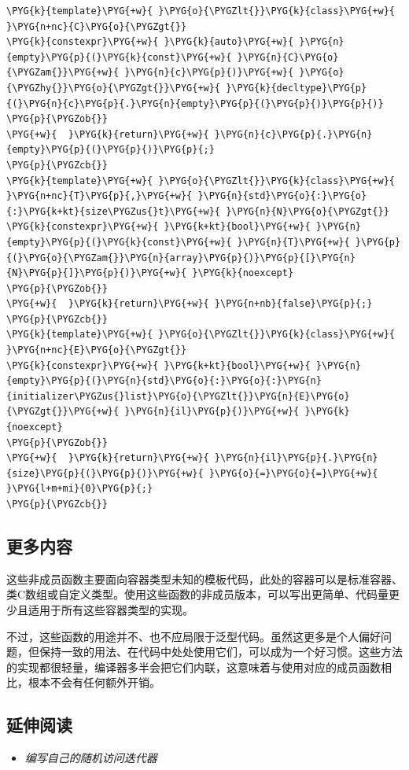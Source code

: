 \begin{itemize}
\begin{codeblockbg}
\begin{Verbatim}[commandchars=\\\{\},breaklines=true,breakanywhere=true,fontsize=\codefont,xleftmargin=17bp]
\PYG{k}{template}\PYG{+w}{ }\PYG{o}{\PYGZlt{}}\PYG{k}{class}\PYG{+w}{ }\PYG{n+nc}{C}\PYG{o}{\PYGZgt{}}
\PYG{k}{constexpr}\PYG{+w}{ }\PYG{k}{auto}\PYG{+w}{ }\PYG{n}{empty}\PYG{p}{(}\PYG{k}{const}\PYG{+w}{ }\PYG{n}{C}\PYG{o}{\PYGZam{}}\PYG{+w}{ }\PYG{n}{c}\PYG{p}{)}\PYG{+w}{ }\PYG{o}{\PYGZhy{}}\PYG{o}{\PYGZgt{}}\PYG{+w}{ }\PYG{k}{decltype}\PYG{p}{(}\PYG{n}{c}\PYG{p}{.}\PYG{n}{empty}\PYG{p}{(}\PYG{p}{)}\PYG{p}{)}
\PYG{p}{\PYGZob{}}
\PYG{+w}{  }\PYG{k}{return}\PYG{+w}{ }\PYG{n}{c}\PYG{p}{.}\PYG{n}{empty}\PYG{p}{(}\PYG{p}{)}\PYG{p}{;}
\PYG{p}{\PYGZcb{}}
\PYG{k}{template}\PYG{+w}{ }\PYG{o}{\PYGZlt{}}\PYG{k}{class}\PYG{+w}{ }\PYG{n+nc}{T}\PYG{p}{,}\PYG{+w}{ }\PYG{n}{std}\PYG{o}{:}\PYG{o}{:}\PYG{k+kt}{size\PYGZus{}t}\PYG{+w}{ }\PYG{n}{N}\PYG{o}{\PYGZgt{}}
\PYG{k}{constexpr}\PYG{+w}{ }\PYG{k+kt}{bool}\PYG{+w}{ }\PYG{n}{empty}\PYG{p}{(}\PYG{k}{const}\PYG{+w}{ }\PYG{n}{T}\PYG{+w}{ }\PYG{p}{(}\PYG{o}{\PYGZam{}}\PYG{n}{array}\PYG{p}{)}\PYG{p}{[}\PYG{n}{N}\PYG{p}{]}\PYG{p}{)}\PYG{+w}{ }\PYG{k}{noexcept}
\PYG{p}{\PYGZob{}}
\PYG{+w}{  }\PYG{k}{return}\PYG{+w}{ }\PYG{n+nb}{false}\PYG{p}{;}
\PYG{p}{\PYGZcb{}}
\PYG{k}{template}\PYG{+w}{ }\PYG{o}{\PYGZlt{}}\PYG{k}{class}\PYG{+w}{ }\PYG{n+nc}{E}\PYG{o}{\PYGZgt{}}
\PYG{k}{constexpr}\PYG{+w}{ }\PYG{k+kt}{bool}\PYG{+w}{ }\PYG{n}{empty}\PYG{p}{(}\PYG{n}{std}\PYG{o}{:}\PYG{o}{:}\PYG{n}{initializer\PYGZus{}list}\PYG{o}{\PYGZlt{}}\PYG{n}{E}\PYG{o}{\PYGZgt{}}\PYG{+w}{ }\PYG{n}{il}\PYG{p}{)}\PYG{+w}{ }\PYG{k}{noexcept}
\PYG{p}{\PYGZob{}}
\PYG{+w}{  }\PYG{k}{return}\PYG{+w}{ }\PYG{n}{il}\PYG{p}{.}\PYG{n}{size}\PYG{p}{(}\PYG{p}{)}\PYG{+w}{ }\PYG{o}{=}\PYG{o}{=}\PYG{+w}{ }\PYG{l+m+mi}{0}\PYG{p}{;}
\PYG{p}{\PYGZcb{}}
\end{Verbatim}
\end{codeblockbg}

\end{itemize}



\subsection{更多内容}



这些非成员函数主要面向容器类型未知的模板代码，此处的容器可以是标准容器、类C数组或自定义类型。使用这些函数的非成员版本，可以写出更简单、代码量更少且适用于所有这些容器类型的实现。



不过，这些函数的用途并不、也不应局限于泛型代码。虽然这更多是个人偏好问题，但保持一致的用法、在代码中处处使用它们，可以成为一个好习惯。这些方法的实现都很轻量，编译器多半会把它们内联，这意味着与使用对应的成员函数相比，根本不会有任何额外开销。



\subsection{延伸阅读}



\begin{itemize}
\item \textit{编写自己的随机访问迭代器}

\end{itemize}
